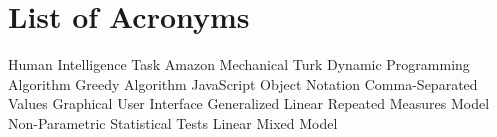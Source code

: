 \documentclass{thesisclass}
\begin{document}

\frontmatter
{}



\tableofcontents
\listoftables
\listoffigures
\chapter*{List of Acronyms}
\begin{acronym} [JSON]
  {Human Intelligence Task}
  {Amazon Mechanical Turk}
  {Dynamic Programming Algorithm}
  {Greedy Algorithm}
  {JavaScript Object Notation}
  {Comma-Separated Values}
  {Graphical User Interface}
  {Generalized Linear Repeated Measures Model}
  {Non-Parametric Statistical Tests}
  {Linear Mixed Model}
\end{acronym}


\mainmatter
{}












{}
{}

{}	%
{}	%

												  


\end{document}

